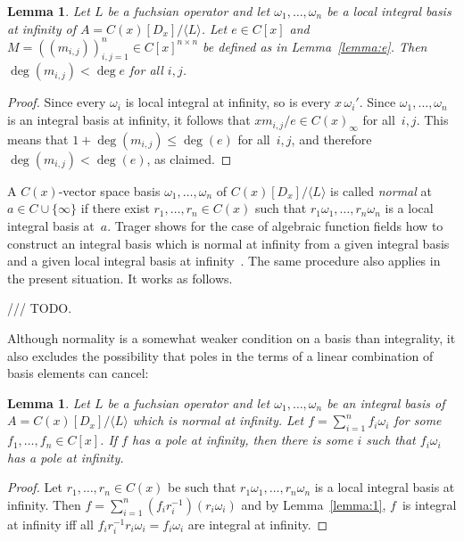 \documentclass{sig-alternate}
\newtheorem{lemma}[theorem]{Lemma}
\def\<#1>{\langle#1\rangle}
\begin{document}
\begin{lemma} \label{lemma:degM}
  Let $L$ be a fuchsian operator and let $\omega_1,\dots,\omega_n$ be a local integral
  basis at infinity of $A=C(x)[D_x]/\<L>$. Let $e\in C[x]$ and $M=((m_{i,j}))_{i,j=1}^n\in C[x]^{n\times n}$
  be defined as in Lemma~\ref{lemma:e}. Then $\deg(m_{i,j})<\deg e$ for all $i,j$.
\end{lemma}
\begin{proof}
  Since every $\omega_i$ is local integral at infinity, so is every $x\,\omega_i'$.
  Since $\omega_1,\dots,\omega_n$ is an integral basis at infinity, it follows that
  $xm_{i,j}/e\in C(x)_\infty$ for all~$i,j$. This means that $1+\deg(m_{i,j})\leq\deg(e)$
  for all~$i,j$, and therefore $\deg(m_{i,j})<\deg(e)$, as claimed.
\end{proof}

A $C(x)$-vector space basis $\omega_1,\dots,\omega_n$ of $C(x)[D_x]/\<L>$ is
called \emph{normal} at $a\in C\cup\{\infty\}$ if there exist $r_1,\dots,r_n\in
C(x)$ such that $r_1\omega_1,\dots,r_n\omega_n$ is a local integral basis
at~$a$. Trager shows for the case of algebraic function fields how to construct
an integral basis which is normal at infinity from a given integral basis and
a given local integral basis at infinity~\cite{trager84}. The same procedure also applies
in the present situation. It works as follows.

/// TODO.

Although normality is a somewhat weaker condition on a basis than integrality,
it also excludes the possibility that poles in the terms of a linear combination
of basis elements can cancel:

\begin{lemma}\label{lemma:3}
  Let $L$ be a fuchsian operator and let $\omega_1,\dots,\omega_n$ be an integral basis of $A=C(x)[D_x]/\<L>$
  which is normal at infinity.
  Let $f=\sum_{i=1}^n f_i\omega_i$ for some $f_1,\dots,f_n\in C[x]$.
  If $f$ has a pole at infinity, then there is some $i$ such that $f_i\omega_i$ has a pole at infinity.
\end{lemma}
\begin{proof}
  Let $r_1,\dots,r_n\in C(x)$ be such that $r_1\omega_1,\dots,r_n\omega_n$ is a
  local integral basis at infinity. Then $f=\sum_{i=1}^n
  (f_ir_i^{-1})(r_i\omega_i)$ and by Lemma~\ref{lemma:1}, $f$~is integral at infinity iff all
  $f_ir_i^{-1}r_i\omega_i=f_i\omega_i$ are integral at infinity.
\end{proof}
\end{document}
